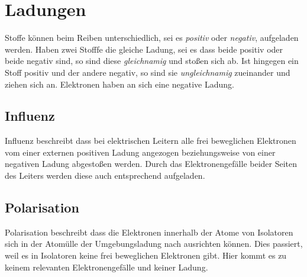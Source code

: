 \documentclass{article}
\begin{document}
 
\section{Ladungen}
Stoffe können beim Reiben unterschiedlich, sei es \emph{positiv} oder \emph{negativ}, aufgeladen werden. Haben zwei Stofffe die gleiche Ladung, sei es dass beide positiv oder beide negativ sind, so sind diese \emph{gleichnamig} und stoßen sich ab. Ist hingegen ein Stoff positiv und der andere negativ, so sind sie \emph{ungleichnamig} zueinander und ziehen sich an. Elektronen haben an sich eine negative Ladung.
 
\begin{multicols}{2}
 \subsection{Influenz}
 Influenz beschreibt dass bei elektrischen Leitern alle frei beweglichen Elektronen vom einer externen positiven Ladung angezogen beziehungsweise von einer negativen Ladung abgestoßen werden. Durch das Elektronengefälle beider Seiten des Leiters werden diese auch entsprechend aufgeladen.
 \begin{center}
 \end{center} 
 \columnbreak 
 \subsection{Polarisation}
 Polarisation beschreibt dass die Elektronen innerhalb der Atome von Isolatoren sich in der Atomülle der Umgebungsladung nach ausrichten können. Dies passiert, weil es in Isolatoren keine frei beweglichen Elektronen gibt. Hier kommt es zu keinem relevanten Elektronengefälle und keiner Ladung.
 \begin{center}
 \end{center} 
\end{multicols} 
 
\end{document}
